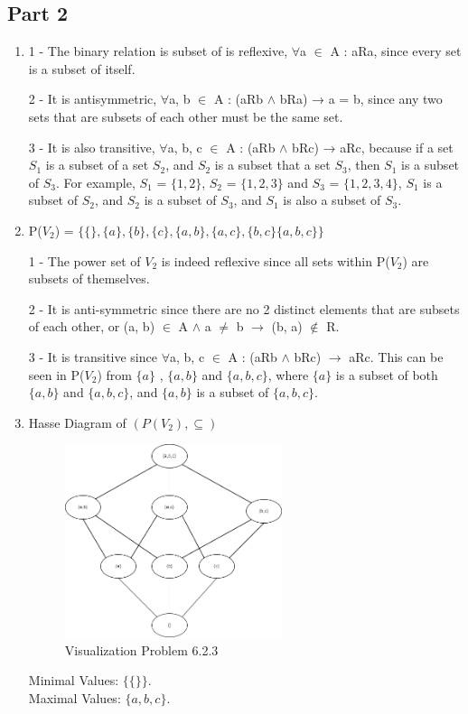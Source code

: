 \documentclass[12pt]{article}
\begin{document}
\subsection*{Part 2}
\begin{enumerate}
	\item 
	1 - The binary relation is subset of is reflexive, $\forall$a $\in$ A : aRa, since every set is a subset of itself.
	
	2 - It is antisymmetric, $\forall$a, b $\in$ A : (aRb $\wedge$ bRa) → a = b, since any two sets that are subsets of each other must be the same set.
	
	3 - It is also transitive, $\forall$a, b, c $\in$ A : (aRb $\wedge$ bRc) → aRc, because if a set \(S_1\) is a subset of a set \(S_2\), and \(S_2\) is a subset that a set \(S_3\), then \(S_1\) is a subset of \(S_3\).
	For example, \(S_1\) = $\{1 , 2\}$, \(S_2\) = $\{1 , 2 , 3\}$ and \(S_3\) = $\{1 , 2 , 3 , 4\}$, \(S_1\) is a subset of \(S_2\), and \(S_2\) is a subset of \(S_3\), and \(S_1\) is also a subset of \(S_3\).
	
	\item
	P(\(V_2\)) = $\{\{\} , \{a\} , \{b\} , \{c\} , \{a,b\} , \{a,c\} , \{b,c\} \{a,b,c\}\}$
	
	1 - The power set of \(V_2\) is indeed reflexive since all sets within P(\(V_2\)) are subsets of themselves.
	
	2 - It is anti-symmetric since there are no 2 distinct elements that are subsets of each other, or (a, b) $\in$ A $\wedge$ a $\neq$ b $\rightarrow$ (b, a) $\not\in$ R.
	
	3 - It is transitive since $\forall$a, b, c $\in$ A : (aRb $\wedge$ bRc) $\rightarrow$ aRc. This can be seen in P(\(V_2\)) from $\{a\}$ , $\{a,b\}$ and $\{a,b,c\}$, where $\{a\}$ is a subset of both $\{a,b\}$ and $\{a,b,c\}$, and $\{a,b\}$ is a subset of $\{a,b,c\}$.

	\item Hasse Diagram of \((P(V_2) , \subseteq)\)
	\begin{figure}[htbp]
		\centering
		\includegraphics[width=0.60\textwidth]{SOEN331_A1_P623.PNG}
		\caption{Visualization Problem 6.2.3}
	\end{figure}

	Minimal Values: \(\{\{\}\}\).\\
	Maximal Values: \(\{a,b,c\}\).
\end{enumerate}
\end{document}
